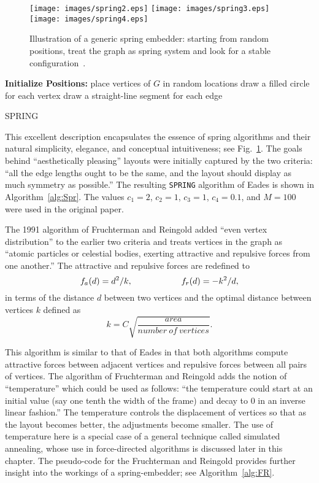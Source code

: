 \documentclass[notitlepage,letter,11pt]{article}
\begin{document}
\begin{figure}[t]
\begin{center}
\texttt{[image: images/spring2.eps]}
\texttt{[image: images/spring3.eps]}
\texttt{[image: images/spring4.eps]}
\end{center}
\caption{\small\sf Illustration of a generic spring embedder: starting from random positions, treat the graph as spring system and look for a stable configuration~\cite{gk-grip-00}.
}
\label{fd:fig:spring}
\end{figure}


\begin{algorithm}
{\bf Initialize Positions:} place vertices of $G$ in random locations\;
draw a filled circle for each vertex\;
draw a straight-line segment for each edge\;
\caption{SPRING \label{alg:Spr}}
\end{algorithm}




This excellent description encapsulates the essence of spring
algorithms and their natural simplicity, elegance, and conceptual
intuitiveness; see Fig.~\ref{fd:fig:spring}. The goals behind ``aesthetically pleasing'' layouts
were initially captured by the two criteria: ``all the edge lengths
ought to be the same, and the layout should display as much symmetry
as possible.'' The resulting {\tt SPRING} algorithm of Eades is shown in Algorithm~\ref{alg:Spr}. The values $c_1=2$, $c_2=1$, $c_3=1$, $c_4=0.1$, and $M=100$ were used in the original paper. 


The 1991 algorithm of Fruchterman and Reingold added ``even vertex
distribution'' to the earlier two criteria and treats vertices in the
graph as ``atomic particles or celestial bodies, exerting attractive
and repulsive forces from one another.'' The attractive and repulsive
forces are redefined to $$f_a(d)=d^2/k,\mbox{\hspace{2cm}}
f_r(d)=-k^2/d,$$
in terms of the distance $d$ between two vertices and the optimal distance between vertices $k$ defined as $$k=C\sqrt{\frac{area}{number\ of\ vertices}}.$$


This algorithm is similar to that of Eades in that both algorithms
compute attractive forces between adjacent vertices and repulsive
forces between all pairs of vertices. The algorithm of Fruchterman and
Reingold adds the notion of ``temperature'' which could be used as
follows: ``the temperature could start at an initial value (say one
tenth the width of the frame) and decay to $0$ in an inverse linear
fashion.'' The temperature controls the displacement of vertices so
that as the layout becomes better, the adjustments become smaller. The
use of temperature here is a special case of a general technique
called simulated annealing, whose use in force-directed algorithms is
discussed later in this chapter. The pseudo-code for the Fruchterman
and Reingold provides further insight into the workings of a
spring-embedder; see Algorithm~\ref{alg:FR}.
\end{document}
